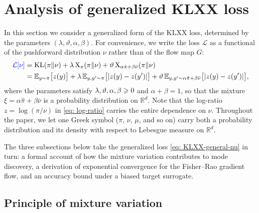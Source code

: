\documentclass{article}
\begin{document}
\section{Analysis of generalized KLXX loss}
\label{sec: FR}

In this section we consider a generalized form of the KLXX loss, determined by the parameters $(\lambda,\vartheta,\alpha,\beta)$. {\color{blue}For convenience, we write the loss $\mathcal L$ as a functional of the pushforward distribution $\nu$ rather than of the flow map $G$:}
\begin{align}
	{\color{blue}\mathcal L[\nu]} & =  \mathrm{KL}(\pi\|\nu) + \lambda\,\mathrm{X}_\pi(\pi\|\nu) + \vartheta\,\mathrm{X}_{\alpha\hat\pi+\beta\bar\nu}(\pi\|\nu) \notag \\
	& = \mathbb E_{y\sim\pi}\big[z(y)\big] +  \lambda\, \mathbb E_{y,y'\sim\pi}\big[|z(y)-z(y')|\big] + \vartheta\, \mathbb E_{y,y'\sim \alpha\hat\pi+\beta\bar\nu}\big[|z(y)-z(y')|\big],
	\label{eq: KLXX-general-nu}
\end{align}
where the parameters satisfy $\lambda,\vartheta,\alpha,\beta\geqslant0$ and $\alpha+\beta=1$, so that the mixture $\xi = \alpha\hat\pi+\beta\bar\nu$ is a probability distribution on $\mathbb R^d${\color{blue}. Note that the log-ratio $z = \log(\pi/\nu)$ in \eqref{eq: log-ratio} carries the entire dependence on $\nu$}. Throughout the paper{\color{blue},} we let one Greek symbol ($\pi$, $\nu$, $\mu$, and so on) carry both a probability distribution and its density with respect to Lebesgue measure on $\mathbb R^d$.

The three subsections below take the generalized loss \eqref{eq: KLXX-general-nu} in turn: a formal account of how the mixture variation contributes to mode discovery, a derivation of exponential convergence for the Fisher--Rao gradient flow, and an accuracy bound under a biased target surrogate.

\subsection{Principle of mixture variation}
\label{subsec: mixture-variation}
\end{document}

